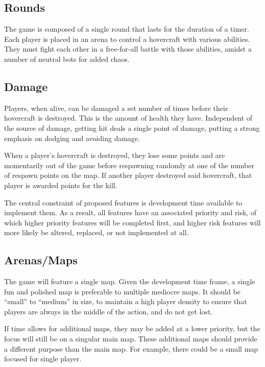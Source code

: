 \documentclass{article}
\theoremstyle{definition}
\begin{document}
\subsection{Rounds}

The game is composed of a single round that lasts for the duration of a timer.
Each player is placed in an arena to control a hovercraft with various
abilities. They must fight each other in a free-for-all battle with those
abilities, amidst a number of neutral bots for added chaos.

\subsection{Damage}

Players, when alive, can be damaged a set number of times before their
hovercraft is destroyed. This is the amount of health they have. Independent of
the source of damage, getting hit deals a single point of damage, putting
a strong emphasis on dodging and avoiding damage.

When a player's hovercraft is destroyed, they lose some points and are
momentarily out of the game before respawning randomly at one of the number of
respawn points on the map. If another player destroyed said hovercraft, that
player is awarded points for the kill.

The central constraint of proposed features is development time available to
implement them. As a result, all features have an associated priority and risk,
of which higher priority features will be completed first, and higher risk
features will more likely be altered, replaced, or not implemented at all.


\subsection{Arenas/Maps}

The game will feature a single map. Given the development time frame, a single
fun and polished map is preferable to multiple mediocre maps. It should be
``small'' to ``medium'' in size, to maintain a high player density to ensure
that players are always in the middle of the action, and do not get lost.

If time allows for additional maps, they may be added at a lower priority, but
the focus will still be on a singular main map. These additional maps should
provide a different purpose than the main map. For example, there could be
a small map focused for single player.
\end{document}
